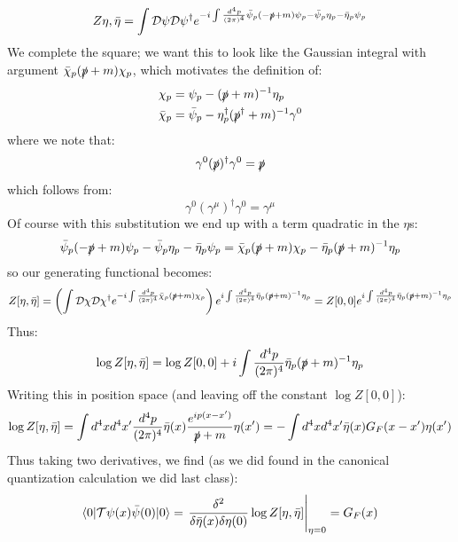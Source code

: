 \begin{equation}
    Z{\eta, \bar{\eta}} = \int \mathcal{D}\psi \mathcal{D}\psi^\dag e^{-i\int \frac{d^4p}{(2\pi)^4}\bar{\psi}_p(-\slashed{p} + m)\psi_p - \bar{\psi}_p\eta_p - \bar{\eta}_p\psi_p}
\end{equation}
We complete the square; we want this to look like the Gaussian integral with argument $\bar{\chi}_p(\slashed{p} + m)\chi_p$, which motivates the definition of:
\begin{equation}
    \begin{split}
        \chi_p &= \psi_p - (\slashed{p} + m)^{-1}\eta_p
        \\ \bar{\chi}_p &= \bar{\psi}_p - \eta^\dag_p(\slashed{p}^\dag + m)^{-1}\gamma^0
    \end{split}
\end{equation}
where we note that:
\begin{equation}
    \gamma^0(\slashed{p})^\dag\gamma^0 = \slashed{p}
\end{equation}
which follows from:
\begin{equation}
    \gamma^0(\gamma^\mu)^\dag\gamma^0 = \gamma^\mu
\end{equation}
Of course with this substitution we end up with a term quadratic in the $\eta$s:
\begin{equation}
    \bar{\psi}_p(-\slashed{p} + m)\psi_p - \bar{\psi}_p\eta_p - \bar{\eta}_p\psi_p = \bar{\chi}_p(\slashed{p} + m)\chi_p - \bar{\eta}_p(\slashed{p} + m)^{-1}\eta_p
\end{equation}
so our generating functional becomes:
\begin{equation}
    Z[\eta, \bar{\eta}] = \left(\int \mathcal{D}\chi \mathcal{D}\chi^\dag e^{-i\int \frac{d^4p}{(2\pi)^4}\bar{\chi}_p(\slashed{p} + m)\chi_p}\right)e^{i\int \frac{d^4p}{(2\pi)^4}\bar{\eta}_p(\slashed{p} + m)^{-1}\eta_p} = Z[0, 0]e^{i\int \frac{d^4p}{(2\pi)^4}\bar{\eta}_p(\slashed{p} + m)^{-1}\eta_p} 
\end{equation}
Thus:
\begin{equation}
    \log Z[\eta, \bar{\eta}] = \log Z[0, 0] + i\int \frac{d^4p}{(2\pi)^4}\bar{\eta}_p(\slashed{p} + m)^{-1}\eta_p
\end{equation}
Writing this in position space (and leaving off the constant $\log Z[0, 0]$):
\begin{equation}
    \log Z[\eta, \bar{\eta}] = \int d^4x d^4x'\frac{d^4p}{(2\pi)^4}\bar{\eta}(x)\frac{e^{ip(x - x')}}{\slashed{p} + m}\eta(x') = -\int d^4x d^4x' \bar{\eta}(x)G_F(x-x')\eta(x')
\end{equation}
Thus taking two derivatives, we find (as we did found in the canonical quantization calculation we did last class):
\begin{equation}
    \bra{0}\mathcal{T}\psi(x)\bar{\psi}(0)\ket{0} = \left.\frac{\delta^2}{\delta \bar{\eta}(x)\delta \eta(0)}\log Z[\eta, \bar{\eta}]\right|_{\eta=0} = G_F(x)
\end{equation}

